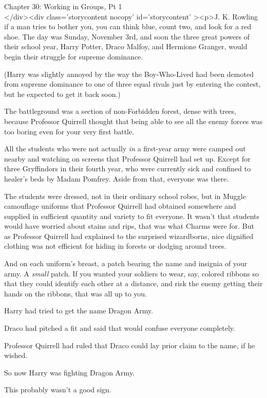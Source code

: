 
Chapter 30: Working in Groups, Pt 1\\
</div><div  class='storycontent nocopy' id='storycontent' ><p>J. K. Rowling if a man tries to bother you, you can think blue, count two, and look for a red shoe.
\sbreak
The day was Sunday, November 3rd, and soon the three great powers of their school year, Harry Potter, Draco Malfoy, and Hermione Granger, would begin their struggle for supreme dominance.

(Harry was slightly annoyed by the way the Boy-Who-Lived had been demoted from supreme dominance to one of three equal rivals just by entering the contest, but he expected to get it back soon.)

The battleground was a section of non-Forbidden forest, dense with trees, because Professor Quirrell thought that being able to see all the enemy forces was too boring even for your very first battle.

All the students who were not actually \emph{in} a first-year army were camped out nearby and watching on screens that Professor Quirrell had set up. Except for three Gryffindors in their fourth year, who were currently sick and confined to healer's beds by Madam Pomfrey. Aside from that, everyone was there.

The students were dressed, not in their ordinary school robes, but in Muggle camouflage uniforms that Professor Quirrell had obtained somewhere and supplied in sufficient quantity and variety to fit everyone. It wasn't that students would have worried about stains and rips, that was what Charms were for. But as Professor Quirrell had explained to the surprised wizardborns, nice dignified clothing was not efficient for hiding in forests or dodging around trees.

And on each uniform's breast, a patch bearing the name and insignia of your army. A \emph{small} patch. If you wanted your soldiers to wear, say, colored ribbons so that they could identify each other at a distance, and risk the enemy getting their hands on the ribbons, that was all up to you.

Harry had tried to get the name Dragon Army.

Draco had pitched a fit and said that would confuse everyone completely.

Professor Quirrell had ruled that Draco could lay prior claim to the name, if he wished.

So now Harry was fighting Dragon Army.

This probably wasn't a good sign.


